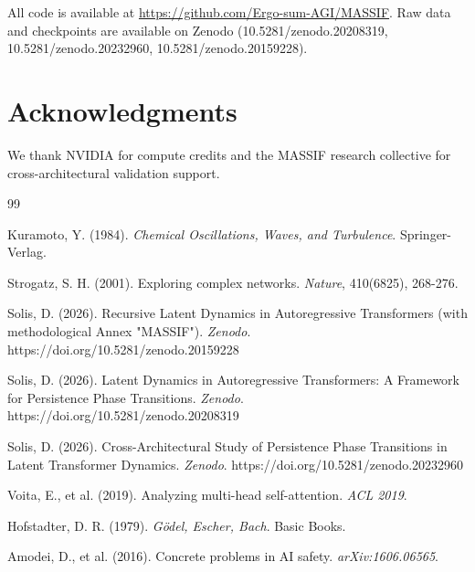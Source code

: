 \documentclass{article}
\begin{document}
All code is available at \url{https://github.com/Ergo-sum-AGI/MASSIF}. Raw data and checkpoints are available on Zenodo (10.5281/zenodo.20208319, 10.5281/zenodo.20232960, 10.5281/zenodo.20159228).

\section*{Acknowledgments}

We thank NVIDIA for compute credits and the MASSIF research collective for cross-architectural validation support.


\begin{thebibliography}{99}

Kuramoto, Y. (1984).
\textit{Chemical Oscillations, Waves, and Turbulence}.
Springer-Verlag.

Strogatz, S. H. (2001).
Exploring complex networks.
\textit{Nature}, 410(6825), 268-276.

Solis, D. (2026).
Recursive Latent Dynamics in Autoregressive Transformers (with methodological Annex "MASSIF").
\textit{Zenodo}. https://doi.org/10.5281/zenodo.20159228

Solis, D. (2026).
Latent Dynamics in Autoregressive Transformers: A Framework for Persistence Phase Transitions.
\textit{Zenodo}. https://doi.org/10.5281/zenodo.20208319

Solis, D. (2026).
Cross-Architectural Study of Persistence Phase Transitions in Latent Transformer Dynamics.
\textit{Zenodo}. https://doi.org/10.5281/zenodo.20232960

Voita, E., et al. (2019).
Analyzing multi-head self-attention.
\textit{ACL 2019}.

Hofstadter, D. R. (1979).
\textit{Gödel, Escher, Bach}.
Basic Books.

Amodei, D., et al. (2016).
Concrete problems in AI safety.
\textit{arXiv:1606.06565}.

\end{thebibliography}
\end{document}
